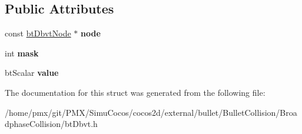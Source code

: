 \subsection*{Public Attributes}
\begin{DoxyCompactItemize}
\item 
\mbox{\label{structbtDbvt_1_1sStkNPS_a2b7000423fb731c02e680a8932a7d72f}} 
const \hyperlink{structbtDbvtNode}{bt\+Dbvt\+Node} $\ast$ {\bfseries node}
\item 
\mbox{\label{structbtDbvt_1_1sStkNPS_a2a0670124f8f596e063b2db5a65fb56e}} 
int {\bfseries mask}
\item 
\mbox{\label{structbtDbvt_1_1sStkNPS_a28a1b65c341ae1bbfb435708d4001a90}} 
bt\+Scalar {\bfseries value}
\end{DoxyCompactItemize}


The documentation for this struct was generated from the following file\+:\begin{DoxyCompactItemize}
\item 
/home/pmx/git/\+P\+M\+X/\+Simu\+Cocos/cocos2d/external/bullet/\+Bullet\+Collision/\+Broadphase\+Collision/bt\+Dbvt.\+h\end{DoxyCompactItemize}
